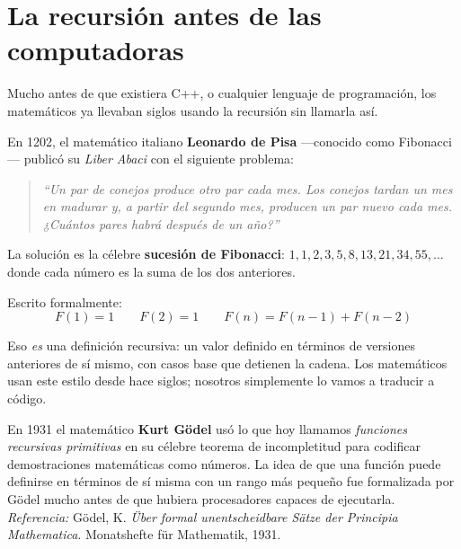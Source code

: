 \documentclass[12pt, oneside]{article}
\begin{document}

\tableofcontents
\newpage

\section{La recursión antes de las computadoras}

Mucho antes de que existiera C++, o cualquier lenguaje de programación,
los matemáticos ya llevaban siglos usando la recursión sin llamarla así.

En 1202, el matemático italiano \textbf{Leonardo de Pisa} —conocido como
Fibonacci— publicó su \textit{Liber Abaci} con el siguiente problema:

\begin{quote}
  \textit{``Un par de conejos produce otro par cada mes.
  Los conejos tardan un mes en madurar y, a partir del segundo mes,
  producen un par nuevo cada mes.
  ¿Cuántos pares habrá después de un año?''}
\end{quote}

La solución es la célebre \textbf{sucesión de Fibonacci}:
$1, 1, 2, 3, 5, 8, 13, 21, 34, 55, \ldots$
donde cada número es la suma de los dos anteriores.

Escrito formalmente:
\[
  F(1) = 1 \qquad F(2) = 1 \qquad F(n) = F(n-1) + F(n-2)
\]

Eso \textit{es} una definición recursiva: un valor definido en términos de
versiones anteriores de sí mismo, con casos base que detienen la cadena.
Los matemáticos usan este estilo desde hace siglos; nosotros simplemente
lo vamos a traducir a código.

\begin{tecnico}
  En 1931 el matemático \textbf{Kurt Gödel} usó lo que hoy llamamos
  \textit{funciones recursivas primitivas} en su célebre teorema de
  incompletitud para codificar demostraciones matemáticas como números.
  La idea de que una función puede definirse en términos de sí misma con
  un rango más pequeño fue formalizada por Gödel mucho antes de que hubiera
  procesadores capaces de ejecutarla.\\
  \textit{Referencia:} Gödel, K. \textit{Über formal unentscheidbare Sätze
  der Principia Mathematica}. Monatshefte für Mathematik, 1931.
\end{tecnico}
\end{document}
